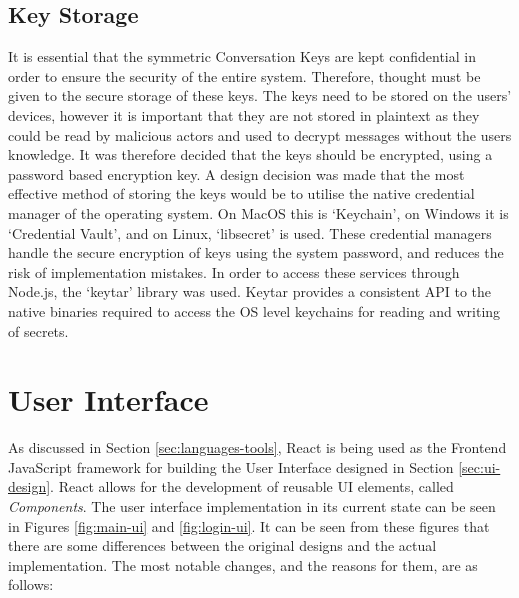 \subsection{Key Storage}
It is essential that the symmetric Conversation Keys are kept confidential in order to ensure the security of the entire system. Therefore, thought must be given to the secure storage of these keys. The keys need to be stored on the users' devices, however it is important that they are not stored in plaintext as they could be read by malicious actors and used to decrypt messages without the users knowledge. It was therefore decided that the keys should be encrypted, using a password based encryption key. A design decision was made that the most effective method of storing the keys would be to utilise the native credential manager of the operating system. On MacOS this is `Keychain', on Windows it is `Credential Vault', and on Linux, `libsecret' is used. These credential managers handle the secure encryption of keys using the system password, and reduces the risk of implementation mistakes. In order to access these services through Node.js, the `keytar' library was used. Keytar provides a consistent API to the native binaries required to access the OS level keychains for reading and writing of secrets.

\section{User Interface}
As discussed in Section \ref{sec:languages-tools}, React is being used as the Frontend JavaScript framework for building the User Interface designed in Section \ref{sec:ui-design}. React allows for the development of reusable UI elements, called \textit{Components}. The user interface implementation in its current state can be seen in Figures \ref{fig:main-ui} and \ref{fig:login-ui}. It can be seen from these figures that there are some differences between the original designs and the actual implementation. The most notable changes, and the reasons for them, are as follows:

